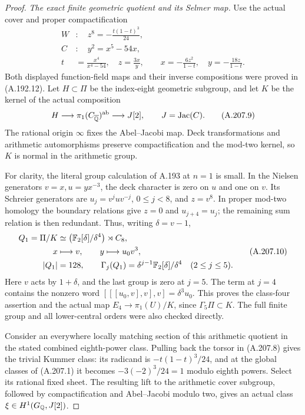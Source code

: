 \begin{proof}
\emph{The exact finite geometric quotient and its Selmer map.}
Use the actual cover and proper compactification
\[
 \begin{aligned}
 W&:\quad z^8=-\frac{t(1-t)^3}{24},\\
 C&:\quad y^2=x^5-54x,\\
 t&=\frac{x^4}{x^4-54},\quad z=\frac{3x}{y},\qquad
 x=-\frac{6z^2}{1-t},\quad y=-\frac{18z}{1-t}.
 \end{aligned}
\tag{A.207.8}
\]
Both displayed function-field maps and their inverse
compositions were proved in (A.192.12).  Let
\(H\subset\Pi\) be the index-eight geometric subgroup,
and let \(K\) be the kernel of the actual composition
\[
       H\longrightarrow\pi_1(C_{\overline{\mathbb Q}})^{\rm ab}
                    \longrightarrow J[2],
       \qquad J=\operatorname{Jac}(C).
\tag{A.207.9}
\]
The rational origin \(\infty\) fixes the Abel--Jacobi map.
Deck transformations and arithmetic automorphisms preserve
compactification and the mod-two kernel, so \(K\) is
normal in the arithmetic group.

For clarity, the literal group calculation of A.193 at
\(n=1\) is small.  In the Nielsen generators
\(v=x, u=yx^{-3}\), the deck character is zero on
\(u\) and one on \(v\).  Its Schreier generators are
\(u_j=v^juv^{-j}\), \(0\le j<8\), and \(z=v^8\).
In proper mod-two homology the boundary relations give
\(z=0\) and \(u_{j+4}=u_j\); the remaining sum relation
is then redundant.  Thus, writing \(\delta=v-1\),
\[
 \begin{aligned}
 Q_1=\Pi/K&\simeq
       \bigl(\mathbb F_2[\delta]/\delta^4\bigr)\rtimes C_8,\\
 x&\longmapsto v,\qquad y\longmapsto u_0v^3,\\
 |Q_1|&=128,\qquad
 \Gamma_j(Q_1)=\delta^{j-1}\mathbb F_2[\delta]/\delta^4
                       \quad(2\le j\le5).
 \end{aligned}
\tag{A.207.10}
\]
Here \(v\) acts by \(1+\delta\), and the last group is
zero at \(j=5\).  The term at \(j=4\) contains the
nonzero word \([[[u_0,v],v],v]=\delta^3u_0\).
This proves the class-four assertion and the actual map
\(E_4\to\pi_1(U)/K\), since \(\Gamma_5\Pi\subset K\).
The full finite group and all lower-central orders were
also checked directly.

Consider an everywhere locally matching section of this
arithmetic quotient in the stated combined eighth-power
class.  Pulling back the torsor in (A.207.8) gives the
trivial Kummer class: its radicand is
\(-t(1-t)^3/24\), and at the global classes of (A.207.1)
it becomes \(-3(-2)^3/24=1\) modulo eighth powers.
Select its rational fixed sheet.  The resulting lift to
the arithmetic cover subgroup, followed by compactification
and Abel--Jacobi modulo two, gives an actual class
\(\xi\in H^1(G_\mathbb Q,J[2])\).


\end{proof}
